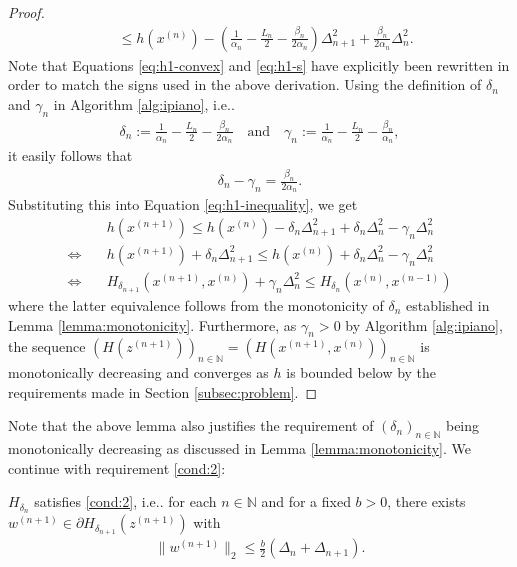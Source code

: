 \documentclass[onecolumn,final,a4paper,13pt,reqno]{siamart}
\makeatletter
\DeclareRobustCommand\onedot{\futurelet\@let@token\@onedot}
\def\@onedot{\ifx\@let@token.\else.\null\fi\xspace}
\def\ie{{i.e}\onedot} \def\Ie{{I.e}\onedot}
\makeatother
\begin{document}
\begin{proof}
\begin{align}
		&\leq h(x^{(n)}) - \left(\frac{1}{\alpha_n} - \frac{L_n}{2} - \frac{\beta_n}{2\alpha_n}\right)\Delta_{n + 1}^2 + \frac{\beta_n}{2\alpha_n} \Delta_n^2.\label{eq:h1-inequality}
	\end{align}
	Note that Equations \eqref{eq:h1-convex} and \eqref{eq:h1-s} have explicitly been rewritten in order to match the signs used in the above derivation. Using the definition of $\delta_n$ and $\gamma_n$ in Algorithm \ref{alg:ipiano}, \ie
	\begin{align}
		\delta_n := \frac{1}{\alpha_n} - \frac{L_n}{2} - \frac{\beta_n}{2\alpha_n}\quad\text{and}\quad\gamma_n := \frac{1}{\alpha_n} - \frac{L_n}{2} - \frac{\beta_n}{\alpha_n},
	\end{align}
	it easily follows that
	\begin{align}
		\delta_n - \gamma_n = \frac{\beta_n}{2\alpha_n}.\label{eq:h1-delta-gamma}
	\end{align}
	Substituting this into Equation \eqref{eq:h1-inequality}, we get
	\begin{align}
		&h(x^{(n + 1)}) \leq h(x^{(n)}) - \delta_n \Delta_{n + 1}^2 + \delta_n \Delta_n^2 - \gamma_n \Delta_n^2\\
		\Leftrightarrow\quad&h(x^{(n + 1)}) + \delta_n \Delta_{n + 1}^2 \leq h(x^{(n)}) + \delta_n\Delta_n^2 - \gamma_n \Delta_n^2\\
		\Leftrightarrow\quad&H_{\delta_{n + 1}}(x^{(n + 1)}, x^{(n)}) + \gamma_n \Delta_n^2 \leq H_{\delta_n}(x^{(n)}, x^{(n - 1)})
	\end{align}
	where the latter equivalence follows from the monotonicity of $\delta_n$ established in Lemma \ref{lemma:monotonicity}. Furthermore, as $\gamma_n > 0$ by Algorithm \ref{alg:ipiano}, the sequence $(H(z^{(n + 1)}))_{n \in \mathbb{N}} = (H(x^{(n + 1)}, x^{(n)}))_{n \in \mathbb{N}}$ is monotonically decreasing and converges as $h$ is bounded below by the requirements made in Section \ref{subsec:problem}.
\end{proof}

Note that the above lemma also justifies the requirement of $(\delta_n)_{n \in \mathbb{N}}$ being monotonically decreasing as discussed in Lemma \ref{lemma:monotonicity}. We continue with requirement \ref{cond:2}:

\begin{lemmamd}
	$H_{\delta_n}$ satisfies \ref{cond:2}, \ie for each $n \in \mathbb{N}$ and for a fixed $b > 0$, there exists $w^{(n + 1)} \in \partial H_{\delta_{n + 1}}(z^{(n + 1)})$ with
	\begin{align}
		\|w^{(n + 1)}\|_2 \leq \frac{b}{2} (\Delta_n + \Delta_{n + 1}).
	\end{align}
\end{lemmamd}
\end{document}
